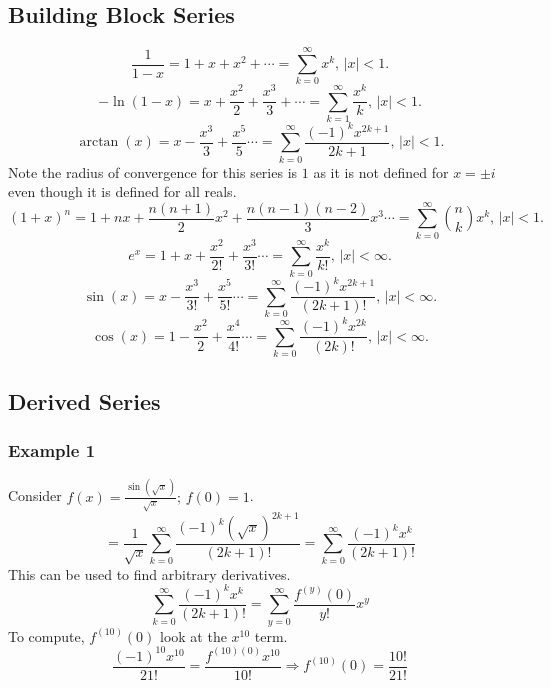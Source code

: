 \documentclass[../main.tex]{subfiles}
\begin{document}
    \subsection{Building Block Series}
        $$\frac{1}{1-x}=1+x+x^{2}+\cdots=\sum_{k=0}^{\infty}x^{k}\text{, }|x|<1\text{.}$$
        $$-\ln(1-x)=x+\frac{x^{2}}{2}+\frac{x^{3}}{3}+\cdots=\sum_{k=1}^{\infty}\frac{x^{k}}{k}\text{, }|x|<1\text{.}$$
        $$\arctan(x)=x-\frac{x^{3}}{3}+\frac{x^{5}}{5}\cdots=\sum_{k=0}^{\infty}\frac{(-1)^{k}x^{2k+1}}{2k+1}\text{, }|x|<1\text{.}$$
        Note the radius of convergence for this series is $1$ as it is not defined for $x=\pm i$ even though it is defined for all reals.
        $$(1+x)^{n}=1+nx+\frac{n(n+1)}{2}x^{2}+\frac{n(n-1)(n-2)}{3}x^{3}\cdots=\sum_{k=0}^{\infty}\binom{n}{k}x^{k}\text{, }|x|<1\text{.}$$
        $$e^{x}=1+x+\frac{x^{2}}{2!}+\frac{x^{3}}{3!}\cdots=\sum_{k=0}^{\infty}\frac{x^{k}}{k!}\text{, }|x|<\infty\text{.}$$
        $$\sin(x)=x-\frac{x^{3}}{3!}+\frac{x^{5}}{5!}\cdots=\sum_{k=0}^{\infty}\frac{(-1)^{k}x^{2k+1}}{(2k+1)!}\text{, }|x|<\infty\text{.}$$
        $$\cos(x)=1-\frac{x^{2}}{2}+\frac{x^{4}}{4!}\cdots=\sum_{k=0}^{\infty}\frac{(-1)^{k}x^{2k}}{(2k)!}\text{, }|x|<\infty\text{.}$$

    \subsection{Derived Series}
        \subsubsection{Example 1}
            Consider $f(x)=\frac{\sin(\sqrt{x})}{\sqrt{x}};\, f(0)=1$.
            $$=\frac{1}{\sqrt{x}}\sum_{k=0}^{\infty}\frac{(-1)^{k}(\sqrt{x})^{2k+1}}{(2k+1)!}=\sum_{k=0}^{\infty}\frac{(-1)^{k}x^{k}}{(2k+1)!}$$
            This can be used to find arbitrary derivatives.
            $$\sum_{k=0}^{\infty}\frac{(-1)^{k}x^{k}}{(2k+1)!}=\sum_{y=0}^{\infty}\frac{f^{(y)}(0)}{y!}x^{y}$$
            To compute, $f^{(10)}(0)$ look at the $x^{10}$ term.
            $$\frac{(-1)^{10}x^{10}}{21!}=\frac{f^{(10)(0)}x^{10}}{10!}\Rightarrow f^{(10)}(0)=\frac{10!}{21!}$$
        
\end{document}
